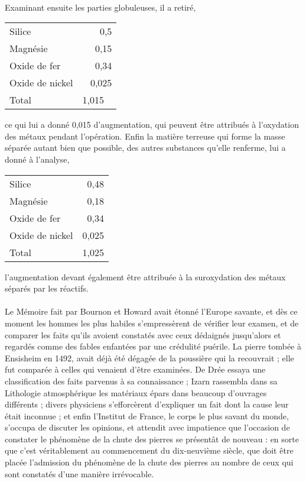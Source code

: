 \documentclass[a4paper, 12pt, oneside, french]{article}
\begin{document}
\paragraph{}
Examinant ensuite les parties globuleuses, il a retiré,
\begin{table}[H]
    \centering
    \Fontauri
    \large
    \begin{tabular}{l r}
        Silice & 0,5 \\
        Magnésie & 0,15 \\
        Oxide de fer & 0,34 \\
        Oxide de nickel & 0,025 \\ \hline
        Total & 1,015 \
    \end{tabular}
\end{table}
ce qui lui a donné 0,015 d'augmentation, qui peuvent être attribués à l'oxydation des métaux pendant l'opération. Enfin la matière terreuse qui forme la masse séparée autant bien que possible, des autres substances qu'elle renferme, lui a donné à l'analyse,
\begin{table}[H]
    \centering
    \Fontauri
    \large
    \begin{tabular}{l r}
        Silice & 0,48 \\
        Magnésie & 0,18 \\
        Oxide de fer & 0,34 \\
        Oxide de nickel & 0,025 \\ \hline
        Total & 1,025 \\
    \end{tabular}
\end{table}
l'augmentation devant également être attribuée à la suroxydation des métaux séparés par les réactifs.
\paragraph{}
Le Mémoire fait par Bournon et Howard avait étonné l'Europe savante, et dès ce moment les hommes les plus habiles s'empressèrent de vérifier leur examen, et de comparer les faits qu'ils avoient constatés avec ceux dédaignés jusqu'alors et regardés comme des fables enfantées par une crédulité puérile. La pierre tombée à Ensisheim en 1492, avait déjà été dégagée de la poussière qui la recouvrait ; elle fut comparée à celles qui venaient d'être examinées. De Drée essaya une classification des faits parvenus à sa connaissance ; Izarn rassembla dans sa Lithologie atmosphérique les matériaux épars dans beaucoup d'ouvrages différents ; divers physiciens s'efforcèrent d'expliquer un fait dont la cause leur était inconnue ; et enfin l'Institut de France, le corps le plus savant du monde, s'occupa de discuter les opinions, et attendit avec impatience que l'occasion de constater le phénomène de la chute des pierres se présentât de nouveau : en sorte que c'est véritablement au commencement du dix-neuvième siècle, que doit être placée l'admission du phénomène de la chute des pierres au nombre de ceux qui sont constatés d'une manière irrévocable.
\end{document}

